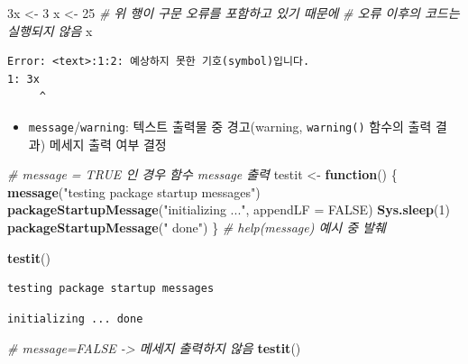 \documentclass[
  11pt,
]{krantz}
\newenvironment{Shaded}{\begin{snugshade}}{\end{snugshade}}
\newcommand{\CommentTok}[1]{\textcolor[rgb]{0.37,0.37,0.37}{\textit{#1}}}
\newcommand{\ControlFlowTok}[1]{\textcolor[rgb]{0.27,0.27,0.27}{\textbf{#1}}}
\newcommand{\DataTypeTok}[1]{\textcolor[rgb]{0.27,0.27,0.27}{#1}}
\newcommand{\DecValTok}[1]{\textcolor[rgb]{0.06,0.06,0.06}{#1}}
\newcommand{\KeywordTok}[1]{\textcolor[rgb]{0.27,0.27,0.27}{\textbf{#1}}}
\newcommand{\NormalTok}[1]{#1}
\newcommand{\OtherTok}[1]{\textcolor[rgb]{0.37,0.37,0.37}{#1}}
\newcommand{\StringTok}[1]{\textcolor[rgb]{0.5,0.5,0.5}{#1}}
\providecommand{\tightlist}{%
  \setlength{\itemsep}{0pt}\setlength{\parskip}{0pt}}
\begin{document}
\footnotesize

\begin{Shaded}
\begin{Highlighting}[]
\NormalTok{3x <-}\StringTok{ }\DecValTok{3}
\NormalTok{x <-}\StringTok{ }\DecValTok{25} \CommentTok{# 위 행이 구문 오류를 포함하고 있기 때문에}
        \CommentTok{# 오류 이후의 코드는 실행되지 않음}
\NormalTok{x}
\end{Highlighting}
\end{Shaded}

\begin{verbatim}
Error: <text>:1:2: 예상하지 못한 기호(symbol)입니다.
1: 3x
     ^
\end{verbatim}

\normalsize

\begin{itemize}
\tightlist
\item
  \texttt{message}/\texttt{warning}: 텍스트 출력물 중 경고(warning, \texttt{warning()} 함수의 출력 결과) 메세지 출력 여부 결정
\end{itemize}

\footnotesize

\begin{Shaded}
\begin{Highlighting}[]
\CommentTok{# message = TRUE 인 경우 함수 message 출력}
\NormalTok{testit <-}\StringTok{ }\ControlFlowTok{function}\NormalTok{() \{}
  \KeywordTok{message}\NormalTok{(}\StringTok{"testing package startup messages"}\NormalTok{)}
  \KeywordTok{packageStartupMessage}\NormalTok{(}\StringTok{"initializing ..."}\NormalTok{, }\DataTypeTok{appendLF =} \OtherTok{FALSE}\NormalTok{)}
  \KeywordTok{Sys.sleep}\NormalTok{(}\DecValTok{1}\NormalTok{)}
  \KeywordTok{packageStartupMessage}\NormalTok{(}\StringTok{" done"}\NormalTok{)}
\NormalTok{\} }\CommentTok{# help(message) 예시 중 발췌}

\KeywordTok{testit}\NormalTok{()}
\end{Highlighting}
\end{Shaded}

\begin{verbatim}
testing package startup messages
\end{verbatim}

\begin{verbatim}
initializing ... done
\end{verbatim}

\normalsize

\footnotesize

\begin{Shaded}
\begin{Highlighting}[]
\CommentTok{# message=FALSE -> 메세지 출력하지 않음}
\KeywordTok{testit}\NormalTok{()}
\end{Highlighting}
\end{Shaded}
\end{document}
